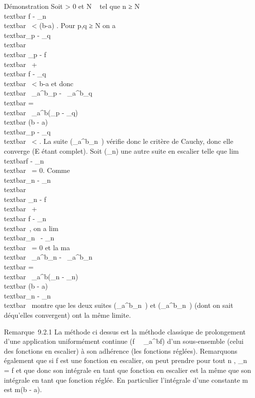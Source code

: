 \documentclass[]{article}
\begin{document}
Démonstration Soit \epsilon \textgreater{} 0 et N \in {}~ tel que n ≥ N
\rigtharrow~\\textbar{} f - \phi\_n\\textbar{}\infty~
\textless{} \epsilon {}(b-a) . Pour p,q ≥ N on a
\\textbar{}\phi\_p -
\phi\_q\\textbar{}\infty~ \leq\\textbar{}
\phi\_p - f\\textbar{}\infty~ +\\textbar{}
f - \phi\_q\\textbar{}\infty~ \textless{} \epsilon
\over b-a et donc
\\textbar{}\int ~
\_a^b\phi\_p -\int ~
\_a^b\phi\_q\\textbar{}
=\\textbar{}\int ~
\_a^b(\phi\_p -
\phi\_q)\\textbar{} \leq (b -
a)\\textbar{}\phi\_p -
\phi\_q\\textbar{}\infty~ \textless{} \epsilon. La suite
(\int  \_a^b\phi\_n~) vérifie
donc le critère de Cauchy, donc elle converge (E étant complet). Soit
(\psi\_n) une autre suite en escalier telle que
lim~\\textbar{}f -
\psi\_n\\textbar{}\infty~ = 0. Comme
\\textbar{}\phi\_n -
\psi\_n\\textbar{}\infty~ \leq\\textbar{}
\phi\_n - f\\textbar{}\infty~ +\\textbar{}
f - \psi\_n\\textbar{}\infty~, on a
lim\\textbar{}\phi\_n~ -
\psi\_n\\textbar{}\infty~ = 0 et la ma\jmathoration
\\textbar{}\int ~
\_a^b\phi\_n -\int ~
\_a^b\psi\_n\\textbar{}
=\\textbar{}\int ~
\_a^b(\phi\_n -
\psi\_n)\\textbar{} \leq (b -
a)\\textbar{}\phi\_n -
\psi\_n\\textbar{}\infty~ montre que les deux suites
(\int  \_a^b\phi\_n~) et
(\int  \_a^b\psi\_n~) (dont on
sait dé qu'elles convergent) ont la même limite.

Remarque~9.2.1 La méthode ci dessus est la méthode classique de
prolongement d'une application uniformément continue
(f\mapsto~\int ~
\_a^bf) d'un sous-ensemble (celui des fonctions en
escalier) à son adhérence (les fonctions réglées). Remarquons également
que si f est une fonction en escalier, on peut prendre pour tout n ,
\phi\_n = f et que donc son intégrale en tant que fonction en
escalier est la même que son intégrale en tant que fonction réglée. En
particulier l'intégrale d'une constante m est m(b - a).
\end{document}
